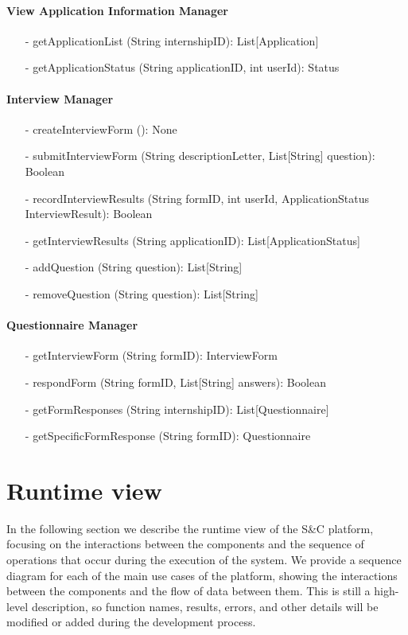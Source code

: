 \paragraph{View Application Information Manager}
\begin{itemize}
    \item[-] getApplicationList (String internshipID): List[Application]
    \item[-] getApplicationStatus (String applicationID, int userId): Status
\end{itemize}

\paragraph{Interview Manager}
\begin{itemize}
    \item[-] createInterviewForm (): None
    \item[-] submitInterviewForm (String descriptionLetter, List[String] question): Boolean
    \item[-] recordInterviewResults (String formID, int userId, ApplicationStatus InterviewResult): Boolean
    \item[-] getInterviewResults (String applicationID): List[ApplicationStatus]
    \item[-] addQuestion (String question): List[String]
    \item[-] removeQuestion (String question): List[String]
\end{itemize}

\paragraph{Questionnaire Manager}
\begin{itemize}
    \item[-] getInterviewForm (String formID): InterviewForm
    \item[-] respondForm (String formID, List[String] answers): Boolean
    \item[-] getFormResponses (String internshipID): List[Questionnaire]
    \item[-] getSpecificFormResponse (String formID): Questionnaire
\end{itemize}


\section{Runtime view}\label{sec:runtime view}
In the following section we describe the runtime view of the S\&C platform, focusing on the interactions between the components and the 
sequence of operations that occur during the execution of the system. We provide a sequence diagram for each of the main use cases of the
platform, showing the interactions between the components and the flow of data between them. This is still a high-level description, so 
function names, results, errors, and other details will be modified or added during the development process.

